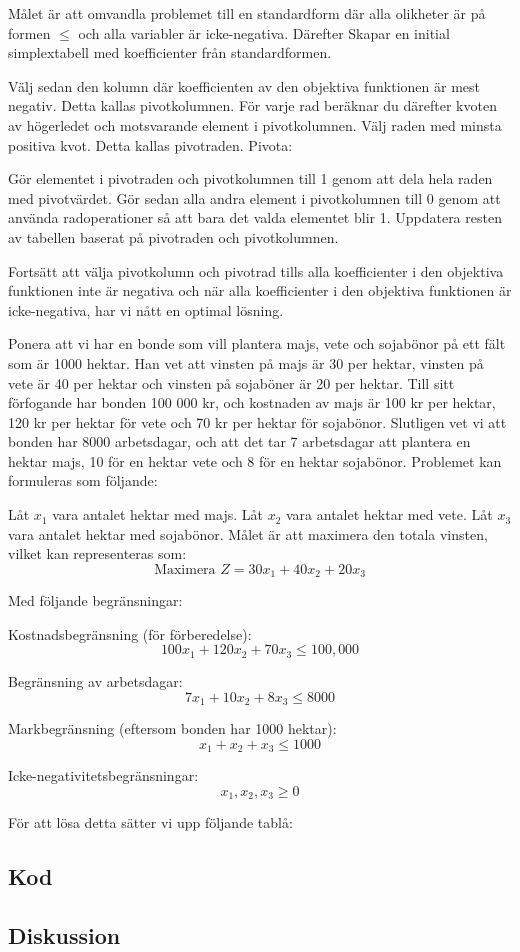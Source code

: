 \documentclass{article}
\begin{document}
Målet är att omvandla problemet till en standardform där alla olikheter är på formen $\leq$ och alla variabler är icke-negativa.
Därefter Skapar en initial simplextabell med koefficienter från standardformen.

Välj sedan den kolumn där koefficienten av den objektiva funktionen är mest negativ. Detta kallas pivotkolumnen. För varje rad beräknar du därefter kvoten av högerledet och motsvarande element i pivotkolumnen. Välj raden med minsta positiva kvot. Detta kallas pivotraden.
Pivota:

Gör elementet i pivotraden och pivotkolumnen till 1 genom att dela hela raden med pivotvärdet. Gör sedan alla andra element i pivotkolumnen till 0 genom att använda radoperationer så att bara det valda elementet blir 1. Uppdatera resten av tabellen baserat på pivotraden och pivotkolumnen.

Fortsätt att välja pivotkolumn och pivotrad tills alla koefficienter i den objektiva funktionen inte är negativa och när alla koefficienter i den objektiva funktionen är icke-negativa, har vi nått en optimal lösning. 

Ponera att vi har en bonde som vill plantera majs, vete och sojabönor på ett fält som är 1000 hektar. Han vet att vinsten på majs är 30 per hektar, vinsten på vete är 40 per hektar och vinsten på sojaböner är 20 per hektar. Till sitt förfogande har bonden 100 000 kr, och kostnaden av majs är 100 kr per hektar, 120 kr per hektar för vete och 70 kr per hektar för sojabönor. Slutligen vet vi att bonden har 8000 arbetsdagar, och att det tar 7 arbetsdagar att plantera en hektar majs, 10 för en hektar vete och 8 för en hektar sojabönor. Problemet kan formuleras som följande:

Låt \( x_1 \) vara antalet hektar med majs.
Låt \( x_2 \) vara antalet hektar med vete.
Låt \( x_3 \) vara antalet hektar med sojabönor.
Målet är att maximera den totala vinsten, vilket kan representeras som:
\[
\text{Maximera } Z = 30x_1 + 40x_2 + 20x_3
\]

Med följande begränsningar:

Kostnadsbegränsning (för förberedelse): 
\[ 100x_1 + 120x_2 + 70x_3 \leq 100,000 \]

Begränsning av arbetsdagar: 
\[ 7x_1 + 10x_2 + 8x_3 \leq 8000 \]

Markbegränsning (eftersom bonden har 1000 hektar): 
\[ x_1 + x_2 + x_3 \leq 1000 \]

Icke-negativitetsbegränsningar: 
\[ x_1, x_2, x_3 \geq 0 \]

För att lösa detta sätter vi upp följande tablå:






\subsection{Kod}

\subsection{Diskussion}
\end{document}
